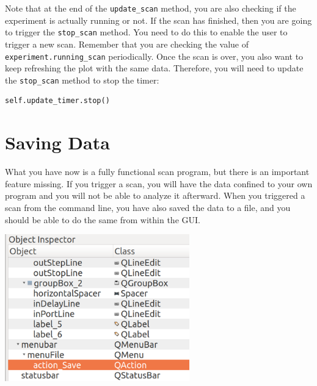 
Note that at the end of the \texttt{update_scan} method, you are also
checking if the experiment is actually running or not. If the scan has
finished, then you are going to trigger the \texttt{stop_scan} method.
You need to do this to enable the user to trigger a new scan. Remember
that you are checking the value of \texttt{experiment.running_scan}
periodically. Once the scan is over, you also want to keep refreshing
the plot with the same data. Therefore, you will need to update the
\texttt{stop_scan} method to stop the timer:

\begin{verbatim}
self.update_timer.stop()
\end{verbatim}

\section{Saving Data}\label{savingdata}
What you have now is a fully functional scan program, but there is an
important feature missing. If you trigger a scan, you will have the data
confined to your own program and you will not be able to analyze it
afterward. When you triggered a scan from the command line, you have
also saved the data to a file, and you should be able to do the same
from within the {GUI}.


\begin{center}
\includegraphics[width=0.6\textwidth]{images/save_menu.png}
\end{center}

